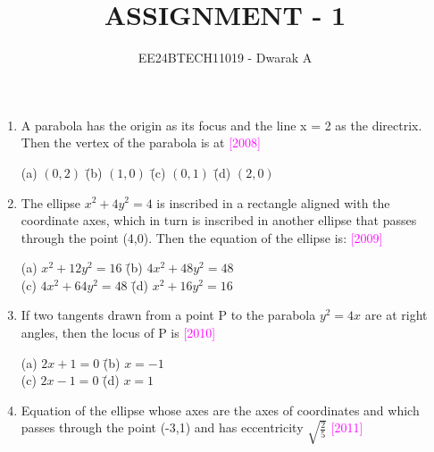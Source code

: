 \documentclass[journal,12pt,twocolumn]{IEEEtran}
\theoremstyle{remark}
\begin{document}

\vspace{3cm}

\title{ASSIGNMENT - 1}
\author{EE24BTECH11019 - Dwarak A}
\maketitle
\newpage
\bigskip

\renewcommand{\thefigure}{\theenumi}
\renewcommand{\thetable}{\theenumi}

\begin{enumerate}[label=\textcolor{magenta}{\arabic*.}]
    \item A parabola has the origin as its focus and the line x = 2 as the directrix. Then the vertex of the parabola is at
    \hfill{\textcolor{magenta}{[2008]}}

    \begin{tabbing}
        (a) $(0,2)$ \hspace{.8em} \= (b) $(1,0)$ \hspace{.8em} \= (c) $(0,1)$ \hspace{.8em} \= (d) $(2,0)$ \\
    \end{tabbing}
    \item The ellipse $x^2+4y^2=4$ is inscribed in a rectangle aligned with the coordinate axes, which in turn is inscribed in another ellipse that passes through the point (4,0). Then the equation of the ellipse is:
    \hfill{\textcolor{magenta}{[2009]}}

    \begin{tabbing}
        (a) $x^2+12y^2=16$ \hspace{1.2em} \= (b) $4x^2+48y^2=48$ \\
        (c) $4x^2+64y^2=48$ \hspace{0.7em} \= (d) $x^2+16y^2=16$ \\
    \end{tabbing}
    \item If two tangents drawn from a point P to the parabola $y^2=4x$ are at right angles, then the locus of P is
    \hfill{\textcolor{magenta}{[2010]}}
    
    \begin{tabbing}
        (a) $2x+1=0$ \hspace{3.2em} \= (b) $x=-1$ \\
        (c) $2x-1=0$ \hspace{3.2em} \= (d) $x=1$ \\
    \end{tabbing}
    \item Equation of the ellipse whose axes are the axes of coordinates and which passes through
    the point (-3,1) and has eccentricity $\sqrt{\frac{2}{5}}$
    \hfill{\textcolor{magenta}{[2011]}}
    

\end{enumerate}
\end{document}
